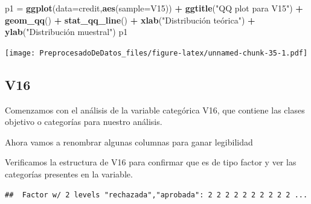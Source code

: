 \documentclass[
]{article}
\newenvironment{Shaded}{\begin{snugshade}}{\end{snugshade}}
\newcommand{\AttributeTok}[1]{\textcolor[rgb]{0.13,0.29,0.53}{#1}}
\newcommand{\FunctionTok}[1]{\textcolor[rgb]{0.13,0.29,0.53}{\textbf{#1}}}
\newcommand{\NormalTok}[1]{#1}
\newcommand{\OtherTok}[1]{\textcolor[rgb]{0.56,0.35,0.01}{#1}}
\newcommand{\SpecialCharTok}[1]{\textcolor[rgb]{0.81,0.36,0.00}{\textbf{#1}}}
\newcommand{\StringTok}[1]{\textcolor[rgb]{0.31,0.60,0.02}{#1}}
\begin{document}
\begin{Shaded}
\begin{Highlighting}[]
\NormalTok{p1 }\OtherTok{=} \FunctionTok{ggplot}\NormalTok{(}\AttributeTok{data=}\NormalTok{credit,}\FunctionTok{aes}\NormalTok{(}\AttributeTok{sample=}\NormalTok{V15)) }\SpecialCharTok{+}
  \FunctionTok{ggtitle}\NormalTok{(}\StringTok{"QQ plot para V15"}\NormalTok{) }\SpecialCharTok{+}
  \FunctionTok{geom\_qq}\NormalTok{() }\SpecialCharTok{+} 
  \FunctionTok{stat\_qq\_line}\NormalTok{() }\SpecialCharTok{+} 
  \FunctionTok{xlab}\NormalTok{(}\StringTok{"Distribución teórica"}\NormalTok{) }\SpecialCharTok{+} \FunctionTok{ylab}\NormalTok{(}\StringTok{"Distribución muestral"}\NormalTok{)}
\NormalTok{p1}
\end{Highlighting}
\end{Shaded}

\texttt{[image: PreprocesadoDeDatos\_files/figure-latex/unnamed-chunk-35-1.pdf]}

\hypertarget{v16}{%
\subsection{V16}\label{v16}}

Comenzamos con el análisis de la variable categórica V16, que contiene
las clases objetivo o categorías para nuestro análisis.

Ahora vamos a renombrar algunas columnas para ganar legibilidad

\begin{Shaded}
\end{Shaded}

Verificamos la estructura de V16 para confirmar que es de tipo factor y
ver las categorías presentes en la variable.

\begin{Shaded}
\end{Shaded}

\begin{verbatim}
##  Factor w/ 2 levels "rechazada","aprobada": 2 2 2 2 2 2 2 2 2 2 ...
\end{verbatim}
\end{document}
